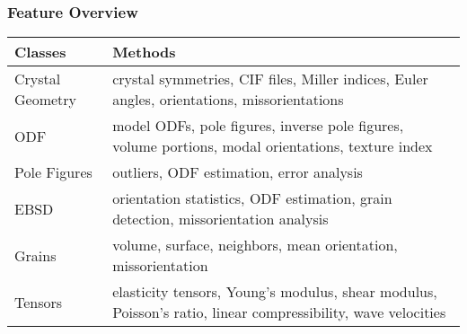 \begin{frame}
  \frametitle{Feature Overview}

 \renewcommand{\arraystretch}{1.25}
 \begin{center}

  \begin{tabular}{p{3cm} p{8cm}}
    Classes & Methods \\
    \toprule
    \rowcolor{blue!10}
    Crystal Geometry & crystal symmetries, CIF files, Miller indices, Euler angles, orientations,
    missorientations\\
    ODF & model ODFs, pole figures, inverse pole figures, volume portions,
    modal orientations, texture index\\
    \rowcolor{blue!10}
    Pole Figures & outliers, ODF estimation, error analysis\\
    EBSD  & orientation statistics, ODF estimation, grain detection,
    missorientation analysis\\
    \rowcolor{blue!10}
    Grains & volume, surface, neighbors, mean orientation, missorientation\\
    Tensors& elasticity tensors, Young's
    modulus, shear modulus, Poisson's ratio, linear compressibility,
    wave velocities
  \end{tabular}
  \end{center}
 \end{frame}


